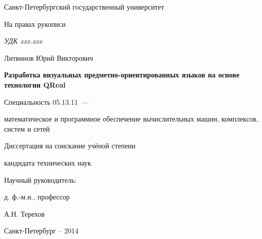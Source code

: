 \thispagestyle{empty}

\begin{center}
Санкт-Петербургский государственный университет\par
\par 
\par
\end{center}

\vspace{20mm}
\begin{flushright}
На правах рукописи

{\sl УДК xxx.xxx}
\end{flushright}

\vspace{30mm}
\begin{center}
{\large Литвинов Юрий Викторович}
\end{center}

\vspace{5mm}
\begin{center}
{\bf \large Разработка визуальных предметно-ориентированных языков на основе технологии QReal
\par}

\vspace{10mm}
{%
Специальность 05.13.11~---

математическое и программное обеспечение вычислительных машин, комплексов, систем и сетей
}

\vspace{10mm}
Диссертация на соискание учёной степени

кандидата технических наук
\end{center}

\vspace{20mm}
\begin{flushright}
Научный руководитель:

д. ф.-м.н., профессор

А.Н. Терехов

\end{flushright}

\vspace{20mm}
\begin{center}
{Санкт-Петербург -- 2014}
\end{center}

\newpage